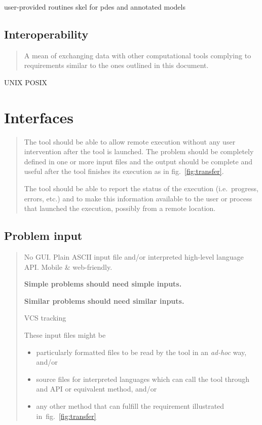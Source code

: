 \documentclass[
  american,
]{article}
\providecommand{\tightlist}{%
  \setlength{\itemsep}{0pt}\setlength{\parskip}{0pt}}
\begin{document}
user-provided routines skel for pdes and annotated models

\hypertarget{sec:interoperability}{%
\subsection{Interoperability}\label{sec:interoperability}}

\begin{quote}
A mean of exchanging data with other computational tools complying to
requirements similar to the ones outlined in this document.
\end{quote}

UNIX POSIX

\hypertarget{interfaces}{%
\section{Interfaces}\label{interfaces}}

\begin{quote}
The tool should be able to allow remote execution without any user
intervention after the tool is launched. The problem should be
completely defined in one or more input files and the output should be
complete and useful after the tool finishes its execution as in
fig.~\ref{fig:transfer}.

The tool should be able to report the status of the execution
(i.e.~progress, errors, etc.) and to make this information available to
the user or process that launched the execution, possibly from a remote
location.
\end{quote}

\hypertarget{sec:input}{%
\subsection{Problem input}\label{sec:input}}

\begin{quote}
No GUI. Plain ASCII input file and/or interpreted high-level language
API. Mobile \& web-friendly.

\textbf{Simple problems should need simple inputs.}

\textbf{Similar problems should need similar inputs.}

VCS tracking

These input files might be

\begin{itemize}
\tightlist
\item
  particularly formatted files to be read by the tool in an
  \emph{ad-hoc} way, and/or
\item
  source files for interpreted languages which can call the tool through
  and API or equivalent method, and/or
\item
  any other method that can fulfill the requirement illustrated
  in~fig.~\ref{fig:transfer}
\end{itemize}
\end{quote}
\end{document}
